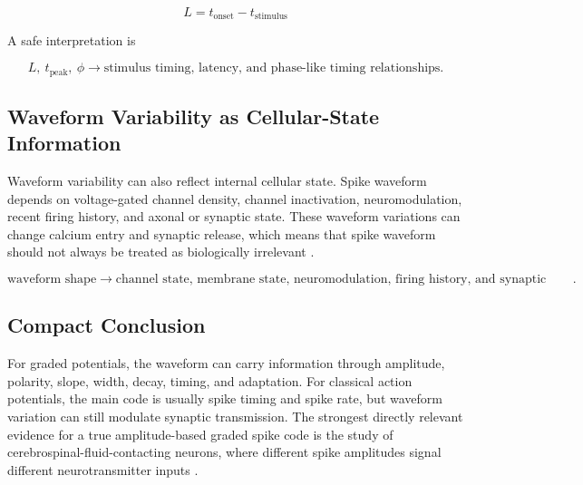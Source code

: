 \documentclass[a4paper]{article}
\begin{document}
            \begin{equation}
                L
                =
                t_{\mathrm{onset}}-t_{\mathrm{stimulus}}
            \end{equation}
            
            A safe interpretation is
            
            \begin{equation}
                L,\ t_{\mathrm{peak}},\ \phi
                \rightarrow
                \text{stimulus timing, latency, and phase-like timing relationships}.
            \end{equation}
        
        \subsection{Waveform Variability as Cellular-State Information}
            
            Waveform variability can also reflect internal cellular state. Spike waveform depends on voltage-gated channel density, channel inactivation, neuromodulation, recent firing history, and axonal or synaptic state. These waveform variations can change calcium entry and synaptic release, which means that spike waveform should not always be treated as biologically irrelevant \citep{zbili-2019-past-and-future-of-analog-digital-modulation-of-synaptic-transmission}.
            
            \begin{equation}
                \text{waveform shape}
                \rightarrow
                \text{channel state, membrane state, neuromodulation, firing history, and synaptic strength}.
            \end{equation}
        
        \subsection{Compact Conclusion}
            
            For graded potentials, the waveform can carry information through amplitude, polarity, slope, width, decay, timing, and adaptation. For classical action potentials, the main code is usually spike timing and spike rate, but waveform variation can still modulate synaptic transmission. The strongest directly relevant evidence for a true amplitude-based graded spike code is the study of cerebrospinal-fluid-contacting neurons, where different spike amplitudes signal different neurotransmitter inputs \citep{johnson-2023-graded-spikes-differentially-signal-neurotransmitter-input-in-cerebrospinal-fluid-contacting-neurons-of-the-mouse-spinal-cord}.
            
            
\end{document}
